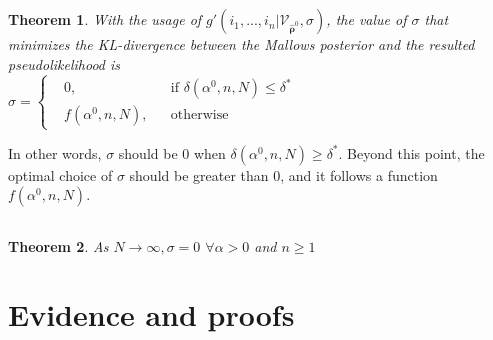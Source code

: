 \documentclass[11pt, oneside]{article}   	%
\newtheorem{theorem}{Theorem}[subsection]
\begin{document}
\subsection{ }
\begin{theorem}\label{theorem:sigmafunction}
With the usage of  $g'(i_1, ...,i_n|\mathcal{V}_{\hat{\bm{\rho}}^0}, \sigma)$, the value of $\sigma$ that minimizes the KL-divergence between the Mallows posterior and the resulted pseudolikelihood is\\
 $
\sigma = \left \{
\begin{aligned}
&0, && \text{if } \delta(\alpha^0,n,N)\leq \delta ^{*} \\
&f(\alpha^0, n,N), && \text{otherwise}
\end{aligned} \right.
$
\end{theorem}

In other words, $\sigma$ should be 0 when $\delta(\alpha^0,n,N) \geq \delta^*$. Beyond this point, the optimal choice of $\sigma$ should be greater than 0, and it follows a function $f(\alpha^0,n,N)$.

\subsection{ }
\begin{theorem}
	As $N \rightarrow \infty,\sigma = 0$  $ \forall \alpha >0$ and $n \geq 1$
\end{theorem}

\section{Evidence and proofs}
\end{document}
